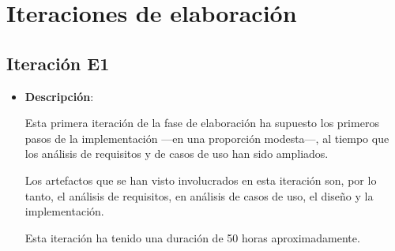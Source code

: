 \section{Iteraciones de elaboración}


\subsection*{Iteración E1}

\begin{itemize}    
\item {\bf Descripción}:

Esta primera iteración de la fase de elaboración ha supuesto los primeros pasos de la implementación ---en una proporción modesta---, al tiempo que los análisis de requisitos y de casos de uso han sido ampliados.

Los artefactos que se han visto involucrados en esta iteración son, por lo tanto, el análisis de requisitos, en análisis de casos de uso, el diseño y la implementación.

Esta iteración ha tenido una duración de 50 horas aproximadamente.
\end{itemize}

